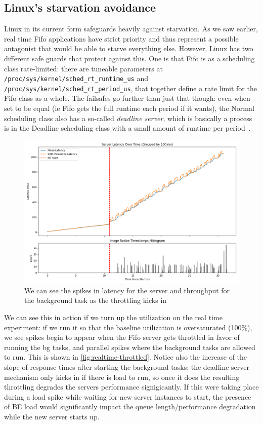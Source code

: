 \subsection{Linux's starvation avoidance}

Linux in its current form safeguards heavily against starvation. As we saw
earlier, real time Fifo applications have strict priority and thus represent a
possible antagonist that would be able to starve everything else. However, Linux
has two different safe guards that protect against this. One is that Fifo is as
a scheduling class rate-limited: there are tuneable parameters at
\texttt{/proc/sys/kernel/sched\_rt\_runtime\_us} and
\texttt{/proc/sys/kernel/sched\_rt\_period\_us}, that together define a rate limit
for the Fifo class as a whole. The failsafes go further than just that though:
even when set to be equal (ie Fifo gets the full runtime each period if it
wants), the Normal scheduling class also has a so-called \textit{deadline
server}, which is basically a process is in the Deadline scheduling class with a
small amount of runtime per period~\cite{TODO}.


\begin{figure}[t]
    \centering
    \includegraphics[width=\columnwidth]{graphs/rt-throttled.png}
    \caption{We can see the spikes in latency for the server and throughput for
    the background task as the throttling kicks
    in}\label{fig:realtime-throttled}
\end{figure}


We can see this in action if we turn up the utilization on the real time
experiment: if we run it so that the baseline utilization is oversaturated
(100\%), we see spikes begin to appear when the Fifo server gets throttled in
favor of running the bg tasks, and parallel spikes where the background tasks
are allowed to run. This is shown in \autoref{fig:realtime-throttled}. Notice
also the increase of the slope of response times after starting the background
tasks: the deadline server mechanism only kicks in if there is load to run, so
once it does the resulting throttling degrades the servers performance
signigicantly. If this were taking place during a load spike while waiting for
new server instances to start, the presence of BE load would significantly
impact the queue length/performance degradation while the new server starts up.


